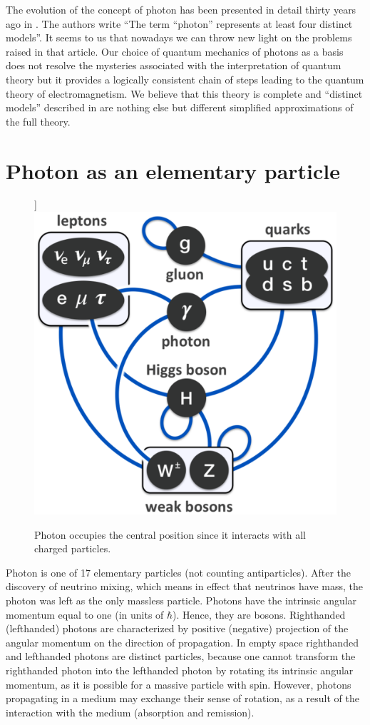 \documentclass[twocolumn,aps,pra,10pt]{revtex4-1}
\begin{document}
The evolution of the concept of photon has been presented in detail thirty years ago in \cite{kaa}. The authors write ``The term ``photon'' represents at least four distinct models''. It seems to us that nowadays we can throw new light on the problems raised in that article. Our choice of quantum mechanics of photons as a basis does not resolve the mysteries associated with the interpretation of quantum theory but it provides a logically consistent chain of steps leading to the quantum theory of electromagnetism. We believe that this theory is complete and ``distinct models'' described in \cite{kaa} are nothing else but different simplified approximations of the full theory.

\section{Photon as an elementary particle}

\begin{figure}]
\includegraphics[scale=0.45]{Fig1.eps}
\caption{Photon occupies the central position since it interacts with all charged particles.}
\end{figure}

Photon is one of 17 elementary particles (not counting antiparticles). After the discovery of neutrino mixing, which means in effect that neutrinos have mass, the photon was left as the only massless particle. Photons have the intrinsic angular momentum equal to one (in units of $\hbar$). Hence, they are bosons. Righthanded (lefthanded) photons are characterized by positive (negative) projection of the angular momentum on the direction of propagation. In empty space righthanded and lefthanded photons are distinct particles, because one cannot transform the righthanded photon into the lefthanded photon by rotating its intrinsic angular momentum, as it is possible for a massive particle with spin. However, photons propagating in a medium may exchange their sense of rotation, as a result of the interaction with the medium (absorption and remission).
\end{document}

